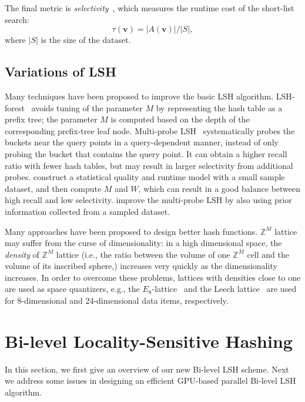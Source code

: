The final metric is \emph{selectivity}~\cite{Dong:2008:MLP}, which measures the runtime cost of the short-list search:
\begin{equation}
\label{eq:6:selectivity}
\tau(\mathbf v) = |A(\mathbf v)| / |S|,
\end{equation}
where $|S|$ is the size of the dataset.

\subsection{Variations of LSH}
Many techniques have been proposed to improve the basic LSH algorithm. LSH-forest~\cite{Bawa:2005:LFS} avoids tuning of the parameter $M$ by representing the hash table as a prefix tree; the parameter $M$ is computed based on the depth of the corresponding prefix-tree leaf node. Multi-probe LSH~\cite{Lv:2007:MLE} systematically probes the buckets near the query points in a query-dependent manner, instead of only probing the bucket that contains the query point. It can obtain a higher recall ratio with fewer hash tables, but may result in larger selectivity from additional probes. \cite{Dong:2008:MLP} construct a statistical quality and runtime model with a small sample dataset, and then compute $M$ and $W$, which can result in a good balance between high recall and low selectivity. \cite{Joly:2008:PML} improve the multi-probe LSH by also using prior information collected from a sampled dataset.

Many approaches have been proposed to design better hash functions. $\mathbb Z^M$ lattice may suffer from the curse of dimensionality: in a high dimensional space, the \emph{density} of $\mathbb Z^M$ lattice (i.e., the ratio between the volume of one $\mathbb Z^M$ cell and the volume of its inscribed sphere,) increases very quickly as the dimensionality increases. In order to overcome these problems, lattices with densities close to one are used as space quantizers, e.g., the $E_8$-lattice~\cite{Jegou:2008} and the Leech lattice~\cite{Andoni:2006:NHA} are used for 8-dimensional and 24-dimensional data items, respectively.




\section{Bi-level Locality-Sensitive Hashing}
\label{sec:6:overview}

In this section, we first give an overview of our new Bi-level LSH scheme. Next we address some issues in designing an efficient GPU-based parallel Bi-level LSH algorithm.

